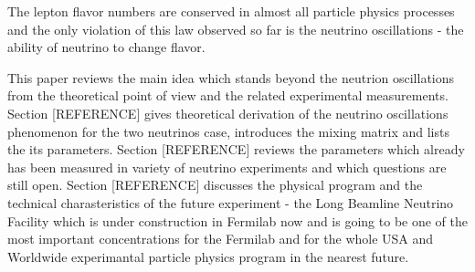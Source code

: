 The lepton flavor numbers are conserved in almost all particle physics processes and the only violation of this law observed so far is the neutrino oscillations - the ability of neutrino to change flavor. 

This paper reviews the main idea which stands beyond the neutrion oscillations from the theoretical point of view and the related experimental measurements. Section [REFERENCE] gives theoretical derivation of the neutrino oscillations phenomenon for the two neutrinos case, introduces the mixing matrix and lists the its parameters. Section [REFERENCE] reviews the parameters which already has been measured in variety of neutrino experiments and which questions are still open. Section [REFERENCE] discusses the physical program and the technical charasteristics of the future experiment - the Long Beamline Neutrino Facility which is under construction in Fermilab now and is going to be one of the most important concentrations for the Fermilab and for the whole USA and Worldwide experimantal particle physics program in the nearest future.

